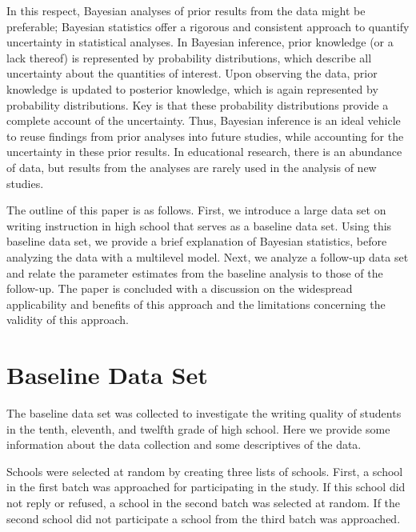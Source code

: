 \documentclass[a4paper]{article}
\newcommand{\DON}	[1] 	{\todo[linecolor=gray, backgroundcolor=white]	{Don: 	{#1}}}
\begin{document}
In this respect, Bayesian analyses of prior results from the data might be preferable; Bayesian statistics offer a rigorous and consistent approach to quantify uncertainty in statistical analyses. In Bayesian inference, prior knowledge (or a lack thereof) is represented by probability distributions, which describe all uncertainty about the quantities of interest. Upon observing the data, prior knowledge is updated to posterior knowledge, which is again represented by probability distributions. Key is that these probability distributions provide a complete account of the uncertainty. Thus, Bayesian inference is an ideal vehicle to reuse findings from prior analyses into future studies, while accounting for the uncertainty in these prior results. In educational research, there is an abundance of data, but results from the analyses are rarely used in the analysis of new studies.

The outline of this paper is as follows. 
First, we introduce a large data set on writing instruction in high school that serves as a baseline data set. 
Using this baseline data set, we provide a brief explanation of Bayesian statistics, before analyzing the data with a multilevel model. 
Next, we analyze a follow-up data set and relate the parameter estimates from the baseline analysis to those of the follow-up. 
The paper is concluded with a discussion on the widespread applicability and benefits of this approach and the limitations concerning the validity of this approach.



\section*{Baseline Data Set}
\noindent The baseline data set was collected to investigate the writing quality of students in the tenth, eleventh, and twelfth grade of high school. Here we provide some information about the data collection and some descriptives of the data.

Schools were selected at random by creating three lists of schools. First, a school in the first batch was approached for participating in the study. If this school did not reply or refused, a school in the second batch was selected at random. If the second school did not participate a school from the third batch was approached.
\end{document}
